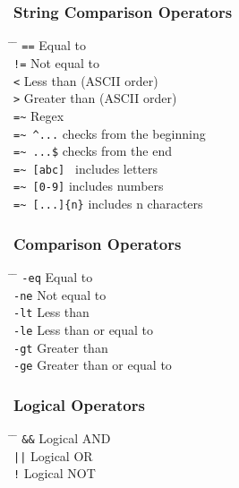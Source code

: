 \documentclass[a4paper,10pt]{article}
\begin{document}
\subsubsection*{String Comparison Operators}
\begin{tabbing}
	\= \hspace{30mm} \= \hspace{50mm} \kill
	\> \verb|==| \> Equal to \\
	\> \verb|!=| \> Not equal to \\
	\> \verb|<| \> Less than (ASCII order) \\
	\> \verb|>| \> Greater than (ASCII order) \\
	\> \verb|=~| \> Regex \\
	\> \verb|=~ ^...| \> checks from the beginning \\
	\> \verb|=~ ...$| \> checks from the end \\
	\> \verb|=~ [abc] | \> includes letters \\
	\> \verb|=~ [0-9]| \> includes numbers \\
	\> \verb|=~ [...]{n}| \> includes n characters \\
\end{tabbing}

\subsubsection*{Comparison Operators}
\begin{tabbing}
	\= \hspace{30mm} \= \hspace{50mm} \kill
	\> \verb|-eq| \> Equal to \\
	\> \verb|-ne| \> Not equal to \\
	\> \verb|-lt| \> Less than \\
	\> \verb|-le| \> Less than or equal to \\
	\> \verb|-gt| \> Greater than \\
	\> \verb|-ge| \> Greater than or equal to \\
\end{tabbing}

\subsubsection*{Logical Operators}
\begin{tabbing}
	\= \hspace{30mm} \= \hspace{50mm} \kill
	\> \verb|&&| \> Logical AND \\
	\> \verb!||! \> Logical OR \\
	\> \verb|!| \> Logical NOT \\
\end{tabbing}
\end{document}
